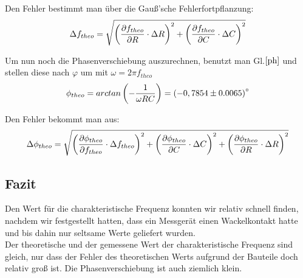 Den Fehler bestimmt man über die Gauß'sche Fehlerfortpflanzung:
\begin{equation}\notag
\Delta f_{theo}=\sqrt{\left(\frac{\partial f_{theo}}{\partial R}\cdot \Delta R\right)^2+\left(\frac{\partial f_{theo}}{\partial C}\cdot \Delta C\right)^2}
\end{equation}

Um nun noch die Phasenverschiebung auszurechnen, benutzt man Gl.\(\eqref{ph}\) und stellen diese nach \(\varphi\) um mit \(\omega=2\pi f_{theo}\)
\begin{equation}\notag
\phi_{theo}=arctan\left(-\frac{1}{\omega RC}\right)=\left(-0,7854 \pm 0.0065\right)^\circ
\end{equation}

Den Fehler bekommt man aus:
\begin{equation}\notag
\Delta \phi_{theo}=\sqrt{\left(\frac{\partial \phi_{theo}}{\partial f_{theo}}\cdot \Delta f_{theo}\right)^2+\left(\frac{\partial \phi_{theo}}{\partial C}\cdot \Delta C\right)^2+\left(\frac{\partial \phi_{theo}}{\partial R}\cdot \Delta R\right)^2}
\end{equation}

\subsection*{Fazit}
Den Wert für die charakteristische Frequenz konnten wir relativ schnell finden, nachdem wir festgestellt hatten, dass ein Messgerät einen Wackelkontakt hatte und bis dahin nur seltsame Werte geliefert wurden.\\
Der theoretische und der gemessene Wert der charakteristische Frequenz sind gleich, nur dass der Fehler des theoretischen Werts aufgrund der Bauteile doch relativ groß ist. Die Phasenverschiebung ist auch ziemlich klein.